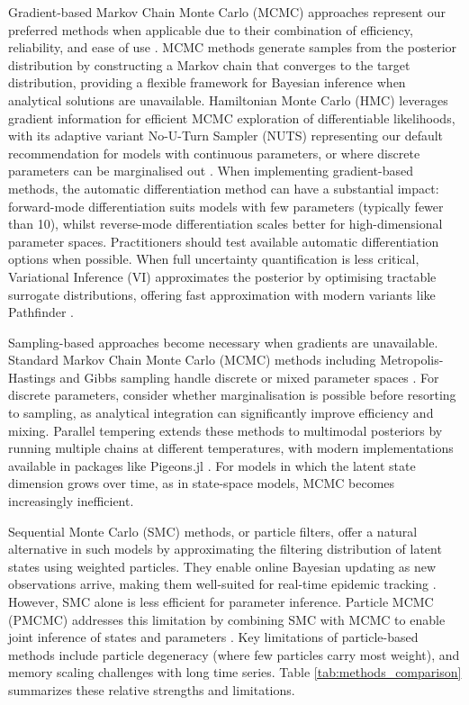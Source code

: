 \documentclass{article}
\begin{document}
Gradient-based Markov Chain Monte Carlo (MCMC) approaches represent our preferred methods when applicable due to their combination of efficiency, reliability, and ease of use \citep{gilks1995markov, lekone2006statistical}.
MCMC methods generate samples from the posterior distribution by constructing a Markov chain that converges to the target distribution, providing a flexible framework for Bayesian inference when analytical solutions are unavailable.
Hamiltonian Monte Carlo (HMC) leverages gradient information for efficient MCMC exploration of differentiable likelihoods, with its adaptive variant No-U-Turn Sampler (NUTS) representing our default recommendation for models with continuous parameters, or where discrete parameters can be marginalised out \citep{duane1987hybrid, hoffman2014no, andrade2020evaluation}.
When implementing gradient-based methods, the automatic differentiation method can have a substantial impact: forward-mode differentiation suits models with few parameters (typically fewer than 10), whilst reverse-mode differentiation scales better for high-dimensional parameter spaces.
Practitioners should test available automatic differentiation options when possible.
When full uncertainty quantification is less critical, Variational Inference (VI) approximates the posterior by optimising tractable surrogate distributions, offering fast approximation with modern variants like Pathfinder \citep{blei2017variational, chatzilena2019contemporary}.

Sampling-based approaches become necessary when gradients are unavailable.
Standard Markov Chain Monte Carlo (MCMC) methods including Metropolis-Hastings and Gibbs sampling handle discrete or mixed parameter spaces \citep{hastings1970monte, geman1984stochastic, gilks1995markov}.
For discrete parameters, consider whether marginalisation is possible before resorting to sampling, as analytical integration can significantly improve efficiency and mixing.
Parallel tempering extends these methods to multimodal posteriors by running multiple chains at different temperatures, with modern implementations available in packages like Pigeons.jl \citep{surjanovic2023pigeons}.
For models in which the latent state dimension grows over time, as in state-space models, MCMC becomes increasingly inefficient.

Sequential Monte Carlo (SMC) methods, or particle filters, offer a natural alternative in such models by approximating the filtering distribution of latent states using weighted particles. They enable online Bayesian updating as new observations arrive, making them well-suited for real-time epidemic tracking \citep{doucet2001introduction, birrell2020efficient, storvik2023sequential}. However, SMC alone is less efficient for parameter inference. Particle MCMC (PMCMC) addresses this limitation by combining SMC with MCMC to enable joint inference of states and parameters \citep{andrieu2010particle, endo2019introduction}. Key limitations of particle-based methods include particle degeneracy (where few particles carry most weight), and  memory scaling challenges with long time series. Table \ref{tab:methods_comparison} summarizes these relative strengths and limitations.
 
\end{document}
